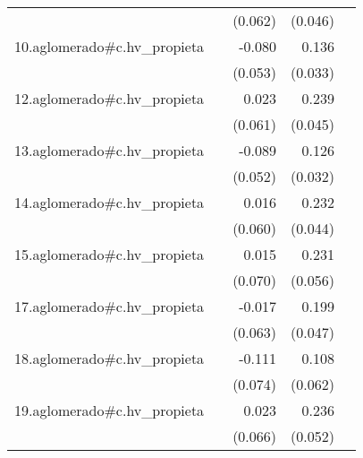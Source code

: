 {\begin{longtable}{l*{4}{D{.}{.}{-1}}}
            &                     &     (0.062)         &     (0.046)         &                     \\
\addlinespace
10.aglomerado#c.hv\_propieta&                     &      -0.080         &       0.136\sym{***}&                     \\
            &                     &     (0.053)         &     (0.033)         &                     \\
\addlinespace
12.aglomerado#c.hv\_propieta&                     &       0.023         &       0.239\sym{***}&                     \\
            &                     &     (0.061)         &     (0.045)         &                     \\
\addlinespace
13.aglomerado#c.hv\_propieta&                     &      -0.089         &       0.126\sym{***}&                     \\
            &                     &     (0.052)         &     (0.032)         &                     \\
\addlinespace
14.aglomerado#c.hv\_propieta&                     &       0.016         &       0.232\sym{***}&                     \\
            &                     &     (0.060)         &     (0.044)         &                     \\
\addlinespace
15.aglomerado#c.hv\_propieta&                     &       0.015         &       0.231\sym{***}&                     \\
            &                     &     (0.070)         &     (0.056)         &                     \\
\addlinespace
17.aglomerado#c.hv\_propieta&                     &      -0.017         &       0.199\sym{***}&                     \\
            &                     &     (0.063)         &     (0.047)         &                     \\
\addlinespace
18.aglomerado#c.hv\_propieta&                     &      -0.111         &       0.108         &                     \\
            &                     &     (0.074)         &     (0.062)         &                     \\
\addlinespace
19.aglomerado#c.hv\_propieta&                     &       0.023         &       0.236\sym{***}&                     \\
            &                     &     (0.066)         &     (0.052)         &                     \\

\end{longtable}}
